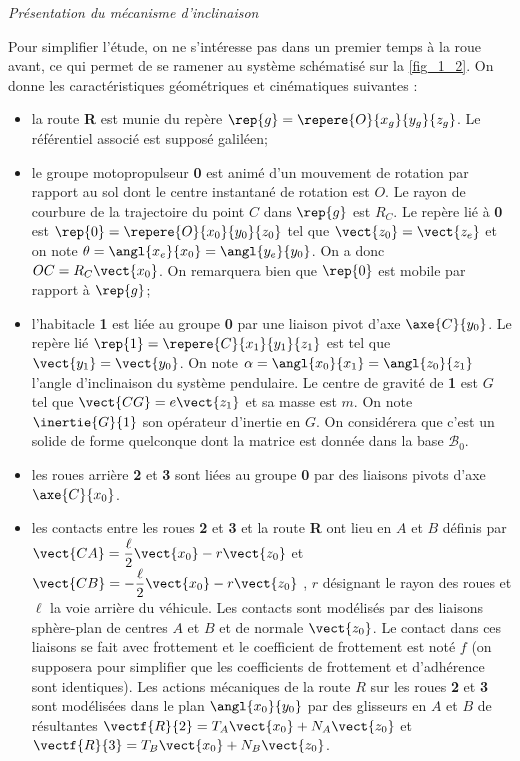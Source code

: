\begin{multicols}{2}
\begin{center}
\textit{Présentation du mécanisme d'inclinaison}
\label{fig_1_1}
\end{center}


Pour simplifier l'étude, on ne s'intéresse pas dans un premier temps à la roue avant, ce qui permet de se ramener au système schématisé sur la \autoref{fig_1_2}. On donne les caractéristiques géométriques et cinématiques suivantes :
\begin{itemize}
\item la route \textbf{R} est munie du repère $\rep{g}=\repere{O}{x_g}{y_g}{z_g}$. Le référentiel associé est supposé galiléen;
\item le groupe motopropulseur \textbf{0} est animé d'un mouvement de rotation par rapport au sol dont le centre instantané de rotation est $O$. Le rayon de courbure de la trajectoire du point $C$ dans $\rep{g}$ est $R_C$. Le repère lié à \textbf{0} est $\rep{0}=\repere{O}{x_0}{y_0}{z_0}$ tel que $\vect{z_0}=\vect{z_e}$ et on note $\theta=\angl{x_e}{x_0}=\angl{y_e}{y_0}$. On a donc $OC=R_C\vect{x_0}$. On remarquera bien que $\rep{0}$ est mobile par rapport à $\rep{g}$;
\item l'habitacle \textbf{1} est liée au groupe \textbf{0} par une liaison pivot d'axe $\axe{C}{y_0}$. Le repère lié $\rep{1}=\repere{C}{x_1}{y_1}{z_1}$ est tel que $\vect{y_1}=\vect{y_0}$. On note $\alpha=\angl{x_0}{x_1}=\angl{z_0}{z_1}$ l'angle d'inclinaison du système pendulaire. Le centre de gravité de \textbf{1} est $G$ tel que $\vect{CG}=e\vect{z_1}$ et sa masse est $m$. On note $\inertie{G}{1}$ son opérateur d'inertie en $G$. On considérera que c'est un solide de forme quelconque dont la matrice est donnée dans la base $\mathcal{B}_0$.
\item les roues arrière \textbf{2} et \textbf{3} sont liées au groupe \textbf{0} par des liaisons pivots d'axe $\axe{C}{x_0}$.
\item les contacts entre les roues \textbf{2} et \textbf{3} et la route \textbf{R} ont lieu en $A$ et $B$ définis par 
$\vect{CA}=\dfrac{\ell}{2}\vect{x_0}-r\vect{z_0}$ et $\vect{CB}=-\dfrac{\ell}{2}\vect{x_0}-r\vect{z_0}$ , $r$ désignant 
le rayon des roues et $\ell$ la voie arrière du véhicule. Les contacts sont modélisés par des liaisons sphère-plan de centres
 $A$ et $B$ et de normale $\vect{z_0}$. Le contact dans ces liaisons se fait avec frottement et le coefficient de frottement est
  noté $f$ (on supposera pour simplifier que les coefficients de frottement et d'adhérence sont identiques). Les actions
  mécaniques de la route $R$ sur les roues \textbf{2} et \textbf{3} sont modélisées dans le plan $\angl{x_0}{y_0}$  par des 
  glisseurs en $A$ et $B$ de résultantes 
  $\vectf{R}{2}=T_A\vect{x_0}+N_A\vect{z_0}$  et  $\vectf{R}{3}=T_B\vect{x_0}+N_B\vect{z_0}$.
\end{itemize}


\end{multicols}
